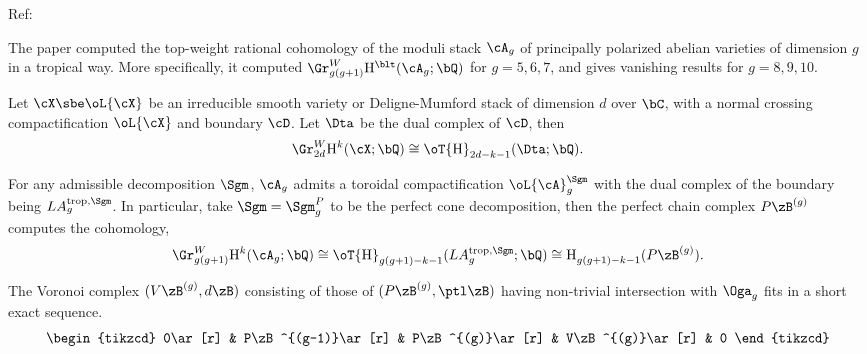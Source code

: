 \documentclass[a4paper, twoside]{article}
\begin{document}
\confighead{}{}{}



Ref:~\cite{BBCMMW2020}

The paper computed the top-weight rational cohomology of the moduli stack $\cA_{g}$ of principally polarized abelian varieties of dimension $g$ in a tropical way. More specifically, it computed $\Gr_{g(g+1)}^{W}\mathrm{H}_{}^{\blt}(\cA_{g};\bQ)$ for $g=5,6,7$, and gives vanishing results for $g=8,9,10$.

\begin{thm}
	Let $\cX\sbe\oL{\cX}$ be an irreducible smooth variety or Deligne-Mumford stack of dimension $d$ over $\bC$, with a normal crossing compactification $\oL{\cX}$ and boundary $\cD$. Let $\Dta$ be the dual complex of $\cD$, then
	\[
		\Gr_{2d}^{W}\mathrm{H}_{}^{k}(\cX;\bQ)\cong \oT{\mathrm{H}}_{2d-k-1}^{}(\Dta;\bQ).
	\]
\end{thm}

\begin{thm}
	For any admissible decomposition $\Sgm$, $\cA_{g}$ admits a toroidal compactification $\oL{\cA}_{g}^{\Sgm}$ with the dual complex of the boundary being $LA_{g}^{\text{trop},\Sgm}$. In particular, take $\Sgm=\Sgm_{g}^{P}$ to be the perfect cone decomposition, then the perfect chain complex $P\zB^{(g)}$ computes the cohomology,
	\[
		\Gr_{g(g+1)}^{W}\mathrm{H}_{}^{k}(\cA_{g};\bQ)\cong \oT{\mathrm{H}}_{g(g+1)-k-1}^{}(LA_{g}^{\text{trop},\Sgm};\bQ)\cong \mathrm{H}_{g(g+1)-k-1}^{}(P\zB^{(g)}).
	\]
\end{thm}

\begin{thm}
	The Voronoi complex $(V\zB^{(g)},d\zB)$ consisting of those of $(P\zB^{(g)},\ptl\zB)$ having non-trivial intersection with $\Oga_{g}$ fits in a short exact sequence.
	\[
		\begin{tikzcd}
			0\ar[r] & P\zB^{(g-1)}\ar[r] & P\zB^{(g)}\ar[r] & V\zB^{(g)}\ar[r] & 0
		\end{tikzcd}
	\]
\end{thm}

\end{document}
